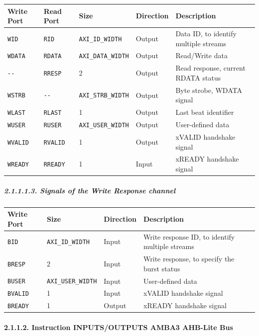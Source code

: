 \documentclass[
]{article}
\begin{document}
\begin{longtable}[]{@{}lllll@{}}
\toprule
Write Port & Read Port & Size & Direction & Description\tabularnewline
\midrule
\endhead
\texttt{WID} & \texttt{RID} & \texttt{AXI\_ID\_WIDTH} & Output & Data
ID, to identify multiple streams\tabularnewline
\texttt{WDATA} & \texttt{RDATA} & \texttt{AXI\_DATA\_WIDTH} & Output &
Read/Write data\tabularnewline
\texttt{-\/-} & \texttt{RRESP} & 2 & Output & Read response, current
RDATA status\tabularnewline
\texttt{WSTRB} & \texttt{-\/-} & \texttt{AXI\_STRB\_WIDTH} & Output &
Byte strobe, WDATA signal\tabularnewline
\texttt{WLAST} & \texttt{RLAST} & 1 & Output & Last beat
identifier\tabularnewline
\texttt{WUSER} & \texttt{RUSER} & \texttt{AXI\_USER\_WIDTH} & Output &
User-defined data\tabularnewline
\texttt{WVALID} & \texttt{RVALID} & 1 & Output & xVALID handshake
signal\tabularnewline
\texttt{WREADY} & \texttt{RREADY} & 1 & Input & xREADY handshake
signal\tabularnewline
\bottomrule
\end{longtable}

\hypertarget{signals-of-the-write-response-channel-2}{%
\subparagraph{2.1.1.1.3. Signals of the Write Response
channel}\label{signals-of-the-write-response-channel-2}}

\begin{longtable}[]{@{}llll@{}}
\toprule
Write Port & Size & Direction & Description\tabularnewline
\midrule
\endhead
\texttt{BID} & \texttt{AXI\_ID\_WIDTH} & Input & Write response ID, to
identify multiple streams\tabularnewline
\texttt{BRESP} & 2 & Input & Write response, to specify the burst
status\tabularnewline
\texttt{BUSER} & \texttt{AXI\_USER\_WIDTH} & Input & User-defined
data\tabularnewline
\texttt{BVALID} & 1 & Input & xVALID handshake signal\tabularnewline
\texttt{BREADY} & 1 & Output & xREADY handshake signal\tabularnewline
\bottomrule
\end{longtable}

\hypertarget{instruction-inputsoutputs-amba3-ahb-lite-bus-1}{%
\paragraph{2.1.1.2. Instruction INPUTS/OUTPUTS AMBA3 AHB-Lite
Bus}\label{instruction-inputsoutputs-amba3-ahb-lite-bus-1}}
\end{document}
